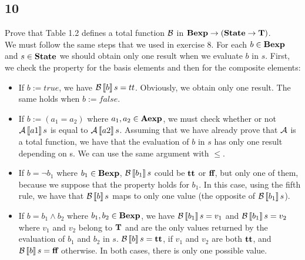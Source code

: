 \subsection{10}

Prove that Table 1.2 defines a total function $\mathcal{B}$ in $\textbf{Bexp} \rightarrow (\textbf{State} \rightarrow \textbf{T})$.\\

We must follow the same steps that we used in exercise 8. For each $b \in \textbf{Bexp}$ and $s \in \textbf{State}$ we should obtain only one result when we evaluate $b$ in $s$. First, we check the property for the basis elements and then for the composite elements:
\begin{itemize}
	\item If $b := true$, we have $\mathcal{B}\left\llbracket b \right\rrbracket s = tt$. Obviously, we obtain only one result. The same holds when $b := false$.
	\item If $b := (a_1 = a_2)$ where $a_1, a_2 \in \textbf{Aexp}$, we must check whether or not $\mathcal{A}\left\llbracket a1 \right\rrbracket s$ is equal to $\mathcal{A}\left\llbracket a2 \right\rrbracket s$. Assuming that we have already prove that $\mathcal{A}$ is a total function, we have that the evaluation of $b$ in $s$ has only one result depending on s. We can use the same argument with $\le$.
	\item If $b = \neg b_1$ where $b_1 \in \textbf{Bexp}$, $\mathcal{B}\left\llbracket b_1 \right\rrbracket s$ could be $\textbf{tt}$ or $\textbf{ff}$, but only one of them, because we suppose that the property holds for $b_1$. In this case, using the fifth rule, we have that $\mathcal{B}\left\llbracket b \right\rrbracket s$ maps to only one value (the opposite of $\mathcal{B}\left\llbracket b_1 \right\rrbracket s$).
	\item If $b = b_1 \wedge b_2$ where $b_1, b_2 \in \textbf{Bexp}$, we have $\mathcal{B}\left\llbracket b_1 \right\rrbracket s = v_1$ and $\mathcal{B}\left\llbracket b_1 \right\rrbracket s = v_2$ where $v_1$ and $v_2$ belong to $\textbf{T}$ and are the only values returned by the evaluation of $b_1$ and $b_2$ in $s$. $\mathcal{B}\left\llbracket b \right\rrbracket s = \textbf{tt}$, if $v_1$ and $v_2$ are both $\textbf{tt}$, and $\mathcal{B}\left\llbracket b \right\rrbracket s = \textbf{ff}$ otherwise. In both cases, there is only one possible value.
\end{itemize}